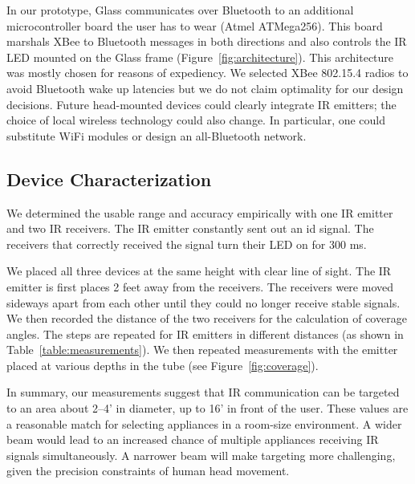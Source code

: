 In our prototype, Glass communicates over Bluetooth to an additional microcontroller board the user has to wear (Atmel ATMega256). This board marshals XBee to Bluetooth messages in both directions and also controls the IR LED mounted on the Glass frame (Figure~\ref{fig:architecture}). This architecture was mostly chosen for reasons of expediency. We selected XBee 802.15.4 radios to avoid Bluetooth  wake up latencies but we do not claim optimality for our design decisions. Future head-mounted devices could clearly integrate IR emitters; the choice of local wireless technology could also change. In particular, one could substitute WiFi modules or design an all-Bluetooth network.

\subsection{Device Characterization}
We determined the usable range and accuracy empirically with one IR emitter and two IR receivers. The IR emitter constantly sent out an id signal. The receivers that correctly received the signal turn their LED on for 300 ms.

We placed all three devices at the same height with clear line of sight. The IR emitter is first places 2 feet away from the receivers. The receivers were moved sideways apart from each other until they could no longer receive stable signals. We then recorded the distance of the two receivers for the calculation of coverage angles. The steps are repeated for IR emitters in different distances (as shown in Table~\ref{table:measurements}). We then repeated measurements with the emitter  placed at various depths in the tube (see Figure~\ref{fig:coverage}). 

In summary, our measurements suggest that IR communication can be targeted to an area about 2--4' in diameter, up to 16' in front of the user. These values are a reasonable match for selecting appliances in a room-size environment. A wider beam would lead to an increased chance of multiple appliances receiving IR signals simultaneously. A narrower beam will make targeting more challenging, given the precision constraints of human head movement.

